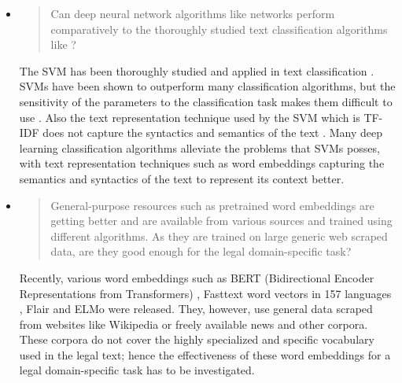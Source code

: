 \begin{itemize}
    \item 
        \begin{quote}
        Can deep neural network algorithms like  networks perform comparatively to the thoroughly studied text classification algorithms like ?
        \end{quote}
        
        The \gls{SVM} has been thoroughly studied and applied in text classification \cite{Chau:2008:MLA:1322568.1322643, Fan:2006:ITM:1217741.1217764, Forman:2008:BFS:1458082.1458119,10.1007/BFb0026683,Sebastiani:2002:MLA:505282.505283,oro15675}. \glspl{SVM} have been shown to outperform many classification algorithms, but the sensitivity of the parameters to the classification task makes them difficult to use \cite{10.1007/978-0-387-34747-9_18}. Also the text representation technique used by the \gls{SVM} which is \gls{TF-IDF} does not capture the syntactics and semantics of the text \cite{Corr_a_J_nior_2017}. Many deep learning classification algorithms alleviate the problems that \glspl{SVM} posses, with text representation techniques such as word embeddings capturing the semantics and syntactics of the text to represent its context better.
        
        
    \item 
    \begin{quote}
        General-purpose resources such as pretrained word embeddings are getting better and are available from various sources and trained using different algorithms. As they are trained on large generic web scraped data, are they good enough for the legal domain-specific task?    
    \end{quote}
    Recently, various word embeddings such as BERT (Bidirectional Encoder Representations from Transformers) \cite{devlin2018bert}, Fasttext word vectors in 157 languages \cite{bojanowski2017enriching}, Flair \cite{akbik2018coling} and ELMo \cite{Peters:2018} were released. They, however, use general data scraped from websites like Wikipedia or freely available news and other corpora. These corpora do not cover the highly specialized and specific vocabulary used in the legal text; hence the effectiveness of these word embeddings for a legal domain-specific task has to be investigated.
    

\end{itemize}
